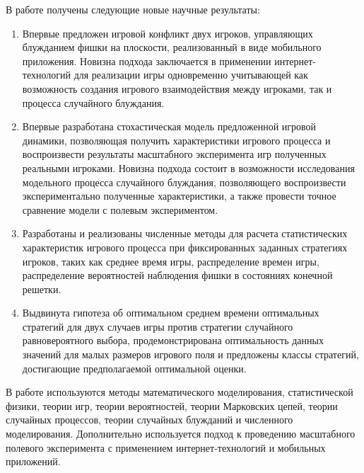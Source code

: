 {\novelty}
В работе получены следующие новые научные результаты:
\begin{enumerate}[beginpenalty=10000] %
  \item Впервые предложен игровой конфликт двух игроков, управляющих блужданием фишки на плоскости, реализованный в виде мобильного приложения.
        Новизна подхода заключается в применении интернет-технологий для реализации игры одновременно учитывающей как 
        возможность создания игрового взаимодействия между игроками, так и процесса случайного блуждания.
  \item Впервые разработана стохастическая модель предложенной игровой динамики, позволяющая получить характеристики игрового процесса 
        и воспроизвести результаты масштабного эксперимента игр полученных реальными игроками. Новизна подхода состоит в возможности 
        исследования модельного процесса случайного блуждания, позволяющего воспроизвести экспериментально полученные характеристики,
        а также провести точное сравнение модели с полевым экспериментом.
  \item Разработаны и реализованы численные методы для расчета статистических характеристик игрового процесса при фиксированных заданных стратегиях игроков,
        таких как среднее время игры, распределение времен игры, распределение вероятностей наблюдения фишки в состояниях конечной решетки. 
  \item Выдвинута гипотеза об оптимальном среднем времени оптимальных стратегий для двух случаев игры против стратегии случайного равновероятного выбора, продемонстрирована
        оптимальность данных значений для малых размеров игрового поля и предложены классы стратегий, достигающие предполагаемой оптимальной оценки.
\end{enumerate}


{\methods} 
В работе используются методы математического моделирования, статистической физики, теории игр, теории вероятностей, теории Марковских цепей, теории случайных процессов, теории случайных блужданий и численного моделирования. Дополнительно используется подход к проведению масштабного полевого эксперимента с применением интернет-технологий и мобильных приложений.


